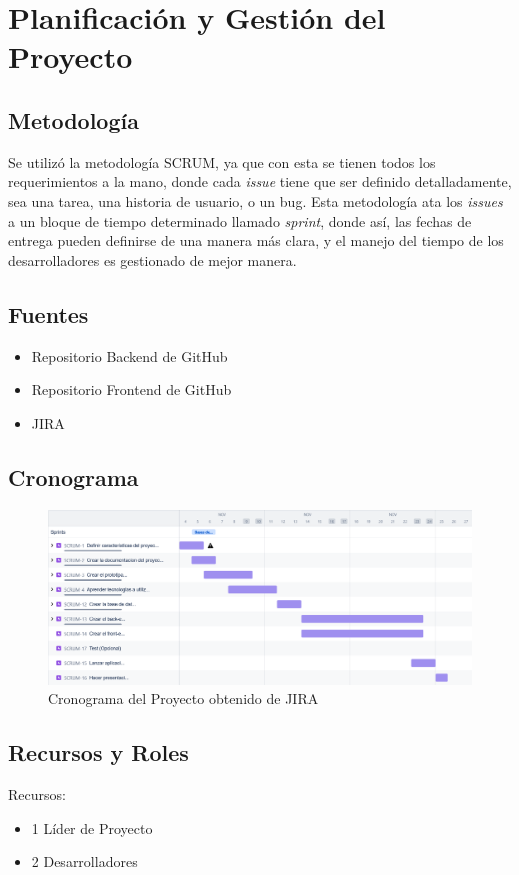	\chapter{Planificación y Gestión del Proyecto}

	\section{Metodología}
	Se utiliz\'o la metodolog\'ia SCRUM, ya que con esta se tienen todos los requerimientos a la mano, donde cada \textit{issue} tiene que ser definido detalladamente, sea una tarea, una historia de usuario, o un bug. Esta metodolog\'ia ata los \textit{issues} a un bloque de tiempo determinado llamado \textit{sprint}, donde as\'i, las fechas de entrega pueden definirse de una manera m\'as clara, y el manejo del tiempo de los desarrolladores es gestionado de mejor manera.
	\section{Fuentes}
	\begin{itemize}
		\item Repositorio Backend de GitHub
		\item Repositorio Frontend de GitHub
		\item JIRA
	\end{itemize}

	\section{Cronograma}
	\begin{figure}[h]
		\centering
		\includegraphics[width=1\linewidth]{./images/proyecto_final_ingr_2024-11-05_11.32am}
		\caption{Cronograma del Proyecto obtenido de JIRA}
	\end{figure}
	
	\section{Recursos y Roles}
	Recursos:
	\begin{itemize}
		\item 1 Líder de Proyecto
		\item 2 Desarrolladores
	\end{itemize}

